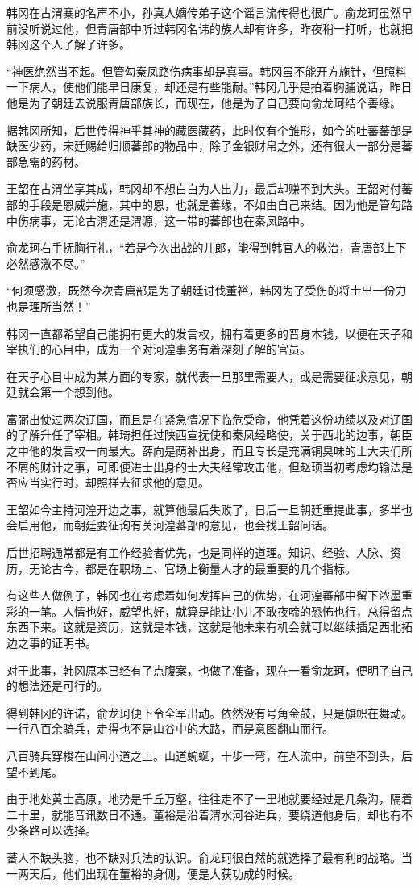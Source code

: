 韩冈在古渭寨的名声不小，孙真人嫡传弟子这个谣言流传得也很广。俞龙珂虽然早前没听说过他，但青唐部中听过韩冈名讳的族人却有许多，昨夜稍一打听，也就把韩冈这个人了解了许多。

“神医绝然当不起。但管勾秦凤路伤病事却是真事。韩冈虽不能开方施针，但照料一下病人，使他们能早日康复，却还是有些能耐。”韩冈几乎是拍着胸脯说话，昨日他是为了朝廷去说服青唐部族长，而现在，他是为了自己要向俞龙珂结个善缘。

据韩冈所知，后世传得神乎其神的藏医藏药，此时仅有个雏形，如今的吐蕃蕃部是缺医少药，宋廷赐给归顺蕃部的物品中，除了金银财帛之外，还有很大一部分是蕃部急需的药材。

王韶在古渭坐享其成，韩冈却不想白白为人出力，最后却赚不到大头。王韶对付蕃部的手段是恩威并施，其中的恩，也就是善缘，不如由自己来结。因为他是管勾路中伤病事，无论古渭还是渭源，这一带的蕃部也在秦凤路中。

俞龙珂右手抚胸行礼，“若是今次出战的儿郎，能得到韩官人的救治，青唐部上下必然感激不尽。”

“何须感激，既然今次青唐部是为了朝廷讨伐董裕，韩冈为了受伤的将士出一份力也是理所当然！”

韩冈一直都希望自己能拥有更大的发言权，拥有着更多的晋身本钱，以便在天子和宰执们的心目中，成为一个对河湟事务有着深刻了解的官员。

在天子心目中成为某方面的专家，就代表一旦那里需要人，或是需要征求意见，朝廷就会第一个想到他。

富弼出使过两次辽国，而且是在紧急情况下临危受命，他凭着这份功绩以及对辽国的了解升任了宰相。韩琦担任过陕西宣抚使和秦凤经略使，关于西北的边事，朝臣之中他的发言权一向最大。薛向是荫补出身，而且专长是充满铜臭味的士大夫们所不屑的财计之事，可即便进士出身的士大夫经常攻击他，但赵顼当初考虑均输法是否应当实行时，却照样去征求他的意见。

王韶如今主持河湟开边之事，就算他最后失败了，日后一旦朝廷重提此事，多半也会启用他，而朝廷要征询有关河湟蕃部的意见，也会找王韶问话。

后世招聘通常都是有工作经验者优先，也是同样的道理。知识、经验、人脉、资历，无论古今，都是在职场上、官场上衡量人才的最重要的几个指标。

有这些人做例子，韩冈也在考虑着如何发挥自己的优势，在河湟蕃部中留下浓墨重彩的一笔。人情也好，威望也好，就算是能让小儿不敢夜啼的恐怖也行，总得留点东西下来。这就是资历，这就是本钱，这就是他未来有机会就可以继续插足西北拓边之事的证明书。

对于此事，韩冈原本已经有了点腹案，也做了准备，现在一看俞龙珂，便明了自己的想法还是可行的。

得到韩冈的许诺，俞龙珂便下令全军出动。依然没有号角金鼓，只是旗帜在舞动。一行八百余骑兵，走得也不是山谷中的大路，而是意图翻山而行。

八百骑兵穿梭在山间小道之上。山道蜿蜒，十步一弯，在人流中，前望不到头，后望不到尾。

由于地处黄土高原，地势是千丘万壑，往往走不了一里地就要经过是几条沟，隔着二十里，就能音讯数日不通。董裕是沿着渭水河谷进兵，要绕道他身后，却也有不少条路可以选择。

蕃人不缺头脑，也不缺对兵法的认识。俞龙珂很自然的就选择了最有利的战略。当一两天后，他们出现在董裕的身侧，便是大获功成的时候。

